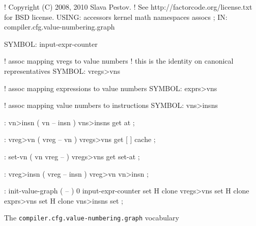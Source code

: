 \centering

  \begin{factorcode}
    ! Copyright (C) 2008, 2010 Slava Pestov.
    ! See http://factorcode.org/license.txt for BSD license.
    USING: accessors kernel math namespaces assocs ;
    IN: compiler.cfg.value-numbering.graph

    SYMBOL: input-expr-counter

    ! assoc mapping vregs to value numbers
    ! this is the identity on canonical representatives
    SYMBOL: vregs>vns

    ! assoc mapping expressions to value numbers
    SYMBOL: exprs>vns

    ! assoc mapping value numbers to instructions
    SYMBOL: vns>insns

    : vn>insn ( vn -- insn ) vns>insns get at ;

    : vreg>vn ( vreg -- vn ) vregs>vns get [ ] cache ;

    : set-vn ( vn vreg -- ) vregs>vns get set-at ;

    : vreg>insn ( vreg -- insn ) vreg>vn vn>insn ;

    : init-value-graph ( -- )
        0 input-expr-counter set
        H{ } clone vregs>vns set
        H{ } clone exprs>vns set
        H{ } clone vns>insns set ;
  \end{factorcode}

\caption{The \texttt{compiler.cfg.value-numbering.graph} vocabulary}

